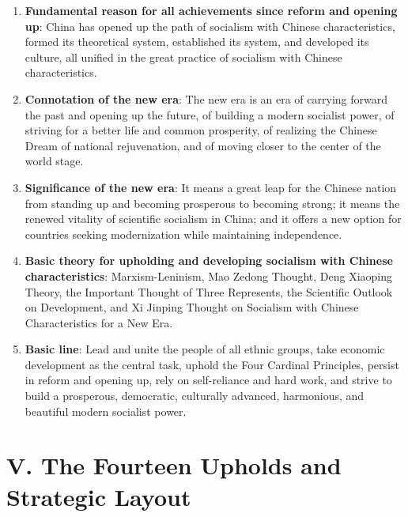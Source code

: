 \documentclass[11pt,a4paper]{ctexart}
\begin{document}
\begin{enumerate}[leftmargin=2em]
    \item \textbf{Fundamental reason for all achievements since reform and opening up}: China has opened up the path of socialism with Chinese characteristics, formed its theoretical system, established its system, and developed its culture, all unified in the great practice of socialism with Chinese characteristics.
    \item \textbf{Connotation of the new era}: The new era is an era of carrying forward the past and opening up the future, of building a modern socialist power, of striving for a better life and common prosperity, of realizing the Chinese Dream of national rejuvenation, and of moving closer to the center of the world stage.
    \item \textbf{Significance of the new era}: It means a great leap for the Chinese nation from standing up and becoming prosperous to becoming strong; it means the renewed vitality of scientific socialism in China; and it offers a new option for countries seeking modernization while maintaining independence.
    \item \textbf{Basic theory for upholding and developing socialism with Chinese characteristics}: Marxism-Leninism, Mao Zedong Thought, Deng Xiaoping Theory, the Important Thought of Three Represents, the Scientific Outlook on Development, and Xi Jinping Thought on Socialism with Chinese Characteristics for a New Era.
    \item \textbf{Basic line}: Lead and unite the people of all ethnic groups, take economic development as the central task, uphold the Four Cardinal Principles, persist in reform and opening up, rely on self-reliance and hard work, and strive to build a prosperous, democratic, culturally advanced, harmonious, and beautiful modern socialist power.
\end{enumerate}

\section{V. The Fourteen Upholds and Strategic Layout}
\end{document}
